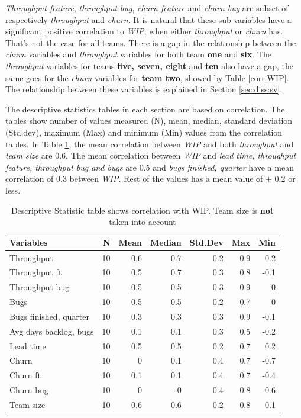\documentclass[UKenglish]{ifimaster}  %
\begin{document}
\textit{Throughput feature}, \textit{throughput bug}, \textit{churn feature} and \textit{churn bug} are subset of 
respectively \textit{throughput} and \textit{churn}. It is natural that these sub variables have a significant positive correlation to \textit{WIP}, when either \textit{throughput}  or  \textit{churn} has. That's not the case for all teams. 
There is a gap in the relationship between the \textit{churn} variables and \textit{throughput} variables for both team \textbf{one} and \textbf{six}. The \textit{throughput} variables for teams \textbf{five, seven, eight} and \textbf{ten} also have a gap, the same goes for the \textit{churn} variables for \textbf{team two},  showed by Table \ref{corr:WIP}.  The relationship between these variables is explained in Section \ref{sec:diss:sv}.


The descriptive statistics tables in each section are based on correlation. The tables show number of values measured (N), mean, median, standard deviation (Std.dev), maximum (Max)  and minimum (Min) values from the correlation tables.
In Table \ref{DS:corr:WIP}, the mean correlation  between \textit{WIP}  and both \textit{throughput} and \textit{team size} are 0.6. The mean correlation between \textit{WIP} and  \textit{lead time, throughput feature, throughput bug and bugs} are 0.5 and \textit{bugs finished, quarter} have a mean correlation of 0.3 between \textit{WIP}. Rest of the values has a mean value of $\pm$ 0.2 or less.
\begin{minipage}[t]{\linewidth}
\begin{table}[H]
 \caption{Descriptive Statistic table shows correlation with WIP. Team size is \textbf{not} taken into account}
 \centering
 \begin{tabular}{ | l | r | r | r | r | r | r | }
 \hline
\textbf{Variables}& \bf{N} & \bf{Mean} & \bf{Median} & \bf{Std.Dev} & \bf{Max} & \bf{Min} \\ \hline
Throughput  & 10 & 0.6 & 0.7 & 0.2 & 0.9 & 0.2\\ \hline
Throughput ft  & 10 & 0.5 & 0.7 & 0.3 & 0.8 & -0.1\\ \hline
Throughput bug  & 10 & 0.5 & 0.5 & 0.3 & 0.9 & 0\\ \hline
Bugs  & 10 & 0.5 & 0.5 & 0.2 & 0.7 & 0\\ \hline
Bugs finished, quarter  & 10 & 0.3 & 0.3 & 0.3 & 0.9 & -0.1\\ \hline
Avg days backlog, bugs  & 10 & 0.1 & 0.1 & 0.3 & 0.5 & -0.2\\ \hline
Lead time & 10 & 0.5 & 0.5 & 0.2 & 0.7 & 0.2\\ \hline
Churn  & 10 & 0 & 0.1 & 0.4 & 0.7 & -0.7\\ \hline
Churn ft  & 10 & 0.1 & 0.1 & 0.4 & 0.7 & -0.4\\ \hline
Churn bug  & 10 & 0 & -0 & 0.4 & 0.8 & -0.6\\ \hline
Team size  & 10 & 0.6 & 0.6 & 0.2 & 0.8 & 0.1\\ \hline
\end{tabular}
 \label{DS:corr:WIP}
 \end{table}
\end{minipage} 
\end{document}
